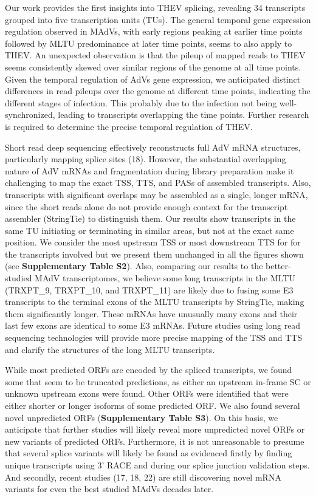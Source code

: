 \documentclass[
]{article}
\begin{document}
Our work provides the first insights into THEV splicing, revealing 34
transcripts grouped into five transcription units (TUs). The general
temporal gene expression regulation observed in MAdVs, with early
regions peaking at earlier time points followed by MLTU predominance at
later time points, seems to also apply to THEV. An unexpected
observation is that the pileup of mapped reads to THEV seems
consistently skewed over similar regions of the genome at all time
points. Given the temporal regulation of AdVs gene expression, we
anticipated distinct differences in read pileups over the genome at
different time points, indicating the different stages of infection.
This probably due to the infection not being well-synchronized, leading
to transcripts overlapping the time points. Further research is required
to determine the precise temporal regulation of THEV.

Short read deep sequencing effectively reconstructs full AdV mRNA
structures, particularly mapping splice sites (18). However, the
substantial overlapping nature of AdV mRNAs and fragmentation during
library preparation make it challenging to map the exact TSS, TTS, and
PASs of assembled transcripts. Also, transcripts with significant
overlaps may be assembled as a single, longer mRNA, since the short
reads alone do not provide enough context for the transcript assembler
(StringTie) to distinguish them. Our results show transcripts in the
same TU initiating or terminating in similar areas, but not at the exact
same position. We consider the most upstream TSS or most downstream TTS
for for the transcripts involved but we present them unchanged in all
the figures shown (see \textbf{Supplementary Table S2}). Also, comparing
our results to the better-studied MAdV transcriptomes, we believe some
long transcripts in the MLTU (TRXPT\_9, TRXPT\_10, and TRXPT\_11) are
likely due to fusing some E3 transcripts to the terminal exons of the
MLTU transcripts by StringTie, making them significantly longer. These
mRNAs have unusually many exons and their last few exons are identical
to some E3 mRNAs. Future studies using long read sequencing technologies
will provide more precise mapping of the TSS and TTS and clarify the
structures of the long MLTU transcripts.

While most predicted ORFs are encoded by the spliced transcripts, we
found some that seem to be truncated predictions, as either an upstream
in-frame SC or unknown upstream exons were found. Other ORFs were
identified that were either shorter or longer isoforms of some predicted
ORF. We also found several novel unpredicted ORFs (\textbf{Supplementary
Table S3}). On this basis, we anticipate that further studies will
likely reveal more unpredicted novel ORFs or new variants of predicted
ORFs. Furthermore, it is not unreasonable to presume that several splice
variants will likely be found as evidenced firstly by finding unique
transcripts using 3' RACE and during our splice junction validation
steps. And secondly, recent studies (17, 18, 22) are still discovering
novel mRNA variants for even the best studied MAdVs decades later.
\end{document}
